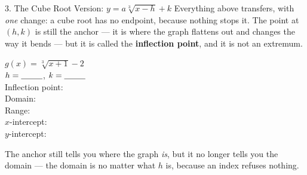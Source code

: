 \documentclass[10pt]{article}
\newcommand{\lgrid}[4]{%
  \draw[step=1, linegray!40, very thin] (#1,#3) grid (#2,#4);
  \draw[->, semithick, charcoal] (#1,0)--(#2,0) node[below right, font=\scriptsize]{$x$};
  \draw[->, semithick, charcoal] (0,#3)--(0,#4) node[left, font=\scriptsize]{$y$};}
\newcommand{\cbrtplot}[5]{%
  \draw[very thick, forest, domain=#2:#5, samples=70, smooth]
    plot (\x,{(#1)*pow((\x)-(#2),1/3)+(#3)});
  \draw[very thick, forest, domain=#4:#2, samples=70, smooth]
    plot (\x,{-(#1)*pow((#2)-(\x),1/3)+(#3)});}
\begin{document}
\begin{notesbox}{3. The Cube Root Version: $y=a\sqrt[3]{x-h}+k$}
Everything above transfers, with \emph{one} change: a cube root has no endpoint, because nothing
stops it. The point at $(h,k)$ is still the anchor --- it is where the graph flattens out and changes
the way it bends --- but it is called the \textbf{inflection point}, and it is not an extremum.
\begin{center}
\begin{minipage}[c]{0.54\linewidth}
\centering
{}
\end{minipage}
\begin{minipage}[c]{0.42\linewidth}
\small
$g(x)=\sqrt[3]{x+1}-2$ \\[4pt]
$h=\blank{0.9cm}$, \; $k=\blank{0.9cm}$ \\[4pt]
Inflection point: \blank{1.8cm} \\[4pt]
Domain: \blank{2.2cm} \\[4pt]
Range: \blank{2.2cm} \\[4pt]
$x$-intercept: \blank{1.6cm} \\[4pt]
$y$-intercept: \blank{1.6cm}
\end{minipage}
\end{center}
\vspace{2pt}
The anchor still tells you where the graph \emph{is}, but it no longer tells you the domain --- the
domain is \blank{2.4cm} no matter what $h$ is, because an \blank{1.4cm} index refuses nothing.


\end{notesbox}
\end{document}
